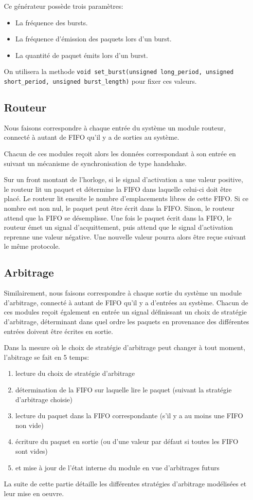 \documentclass[11pt]{article}
\begin{document}
Ce générateur possède trois paramètres:
\begin{itemize}
  \item La fréquence des bursts.
  \item La fréquence d'émission des paquets lors d'un burst.
  \item La quantité de paquet émits lors d'un burst.
\end{itemize}
On utilisera la methode \texttt{void set\_burst(unsigned long\_period, unsigned
short\_period, unsigned burst\_length)} pour fixer ces valeurs.

\subsection{Routeur}
Nous faisons correspondre à chaque entrée du système un module routeur, connecté
à autant de FIFO qu'il y a de sorties au système.

Chacun de ces modules reçoit alors les données correspondant à son entrée en
suivant un mécanisme de synchronisation de type handshake.

Sur un front montant de l'horloge, si le signal d'activation a une valeur positive,
le routeur lit un paquet et détermine la FIFO dans laquelle celui-ci doit être placé.
Le routeur lit ensuite le nombre d'emplacements libres de cette FIFO.
Si ce nombre est non nul, le paquet peut être écrit dans la FIFO.
Sinon, le routeur attend que la FIFO se désemplisse.
Une fois le paquet écrit dans la FIFO, le routeur émet un signal d'acquittement,
puis attend que le signal d'activation reprenne une valeur négative.
Une nouvelle valeur pourra alors être reçue suivant le même protocole.

\subsection{Arbitrage}
Similairement, nous faisons correspondre à chaque sortie du système un module
d'arbitrage, connecté à autant de FIFO qu'il y a d'entrées au système.
Chacun de ces modules reçoit également en entrée un signal définissant un choix
de stratégie d'arbitrage, déterminant dans quel ordre
les paquets en provenance des différentes entrées doivent être écrites en
sortie.


Dans la mesure où le choix de stratégie d'arbitrage peut changer à tout moment,
l'abitrage se fait en 5 temps: 
\begin{enumerate}
\item lecture du choix de stratégie d'arbitrage
\item détermination de la FIFO sur laquelle lire le paquet (suivant la stratégie
d'arbitrage choisie)
\item lecture du paquet dans la FIFO correspondante (s'il y a au moins une FIFO
non vide)
\item écriture du paquet en sortie (ou d'une valeur par défaut si toutes les
FIFO sont vides)
\item et mise à jour de l'état interne du module en vue d'arbitrages futurs
\end{enumerate}
La suite de cette partie détaille les
différentes stratégies d'arbitrage modélisées et leur mise en oeuvre.
\end{document}

